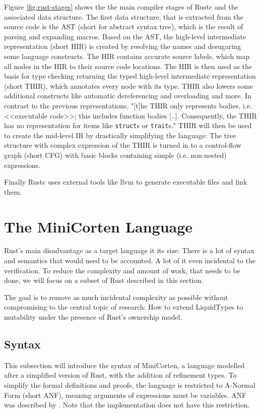 \documentclass{book}
\newcommand{\code}[1]{\texttt{#1}}
\theoremstyle{definition}
\begin{document}
Figure \ref{fig:rust-stages} shows the the main compiler stages of Rustc and the associated data structure. The first data structure, that is extracted from the source code is the AST (short for abstract syntax tree), which is the result of parsing and expanding macros. 
Based on the AST, the high-level intermediate representation (short HIR) is created by resolving the names and desugaring some language constructs. The HIR contains accurate source labels, which map all nodes in the HIR to their source code locations. 
The HIR is then used as the basis for type checking returning the typed high-level intermediate representation (short THIR), which annotates every node with its type. THIR also lowers some additional constructs like automatic dereferencing and overloading and more. In contrast to the previous representations, "[t]he THIR only represents bodies, i.e. <<executable code>>; this includes function bodies [..]. Consequently, the THIR has no representation for items like \code{struct}s or \code{trait}s." \cite[p. 1]{noauthor_thir_nodate}
THIR will then be used to create the mid-level IR by drastically simplifying the language: The tree structure with complex expression of the THIR is turned in to a control-flow graph (short CFG) with basic blocks containing simple (i.e. non-nested) expressions.

Finally Rustc uses external tools \- like llvm \- to generate executable files and link them.


\chapter{The MiniCorten Language}

Rust's main disadvantage as a target language it its size: There is a lot of syntax and semantics that would need to be accounted. A lot of it even incidental to the verification. To reduce the complexity and amount of work, that needs to be done, we will focus on a subset of Rust described in this section.

The goal is to remove as much incidental complexity as possible without compromising to the central topic of research: How to extend LiquidTypes to mutability under the presence of Rust's ownership model.


\section{Syntax}

This subsection will introduce the syntax of MiniCorten, a language modelled after a simplified version of Rust, with the addition of refinement types.
To simplify the formal definitions and proofs, the language is restricted to A-Normal Form (short ANF), meaning arguments of expressions must be variables. ANF was described by \cite{sabry_reasoning_1993}. Note that the implementation does not have this restriction.
\end{document}
